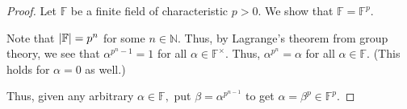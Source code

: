 \finitefieldperfect*\label{cor:finitefieldperfect2}
\begin{flushright}\hyperref[cor:finitefieldperfect]{\upsym}\end{flushright}
\begin{proof}
    Let $\mathbb{F}$ be a finite field of characteristic $p > 0.$ We show that $\mathbb{F} = \mathbb{F}^p.$ 

    Note that ${\left\lvert \mathbb{F} \right\lvert} = p^n$ for some $n \in \mathbb{N}.$ Thus, by Lagrange's theorem from group theory, we see that $\alpha^{p^n - 1} = 1$ for all $\alpha \in \mathbb{F}^\times.$ Thus, $\alpha^{p^n} = \alpha$ for all $\alpha \in \mathbb{F}.$ (This holds for $\alpha = 0$ as well.)

    Thus, given any arbitrary $\alpha \in \mathbb{F},$ put $\beta = \alpha^{p^{n - 1}}$ to get $\alpha = \beta^p \in \mathbb{F}^p.$
\end{proof}

